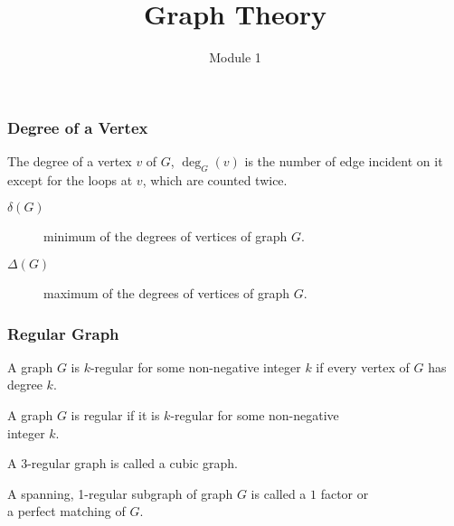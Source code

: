 \documentclass{beamer}
\title{Graph Theory}
\author{Module 1}
\institute{Section 4 : Degree of Vertices}
\begin{document}
\begin{frame}
	\maketitle
\end{frame}

\begin{frame}
\frametitle{Degree of a Vertex}
\begin{definition}[Degree]
	The degree of a vertex $v$ of $G$, $\deg_G(v)$ is the number of edge incident on it except for the loops at $v$, which are counted twice.
\end{definition}

\begin{description}
	\item[$\delta(G)$] minimum of the degrees of vertices of graph $G$.
	\item[$\Delta(G)$] maximum of the degrees of vertices of graph $G$.
\end{description}
\end{frame}

\begin{frame}
\frametitle{Regular Graph}
\begin{definition}[k-regular]
	A graph $G$ is $k$-regular for some non-negative integer $k$ if every vertex of $G$ has degree $k$.
\end{definition}

\begin{definition}[regular]
	A graph $G$ is regular if it is $k$-regular for some non-negative\\ integer $k$.
\end{definition}

\begin{definition}[cubic]
	A $3$-regular graph is called a cubic graph.
\end{definition}

\begin{definition}[1-factor]
	A spanning, 1-regular subgraph of graph $G$ is called a $1$ factor or\\ a perfect matching of $G$.
\end{definition}
\end{frame}
\end{document}

